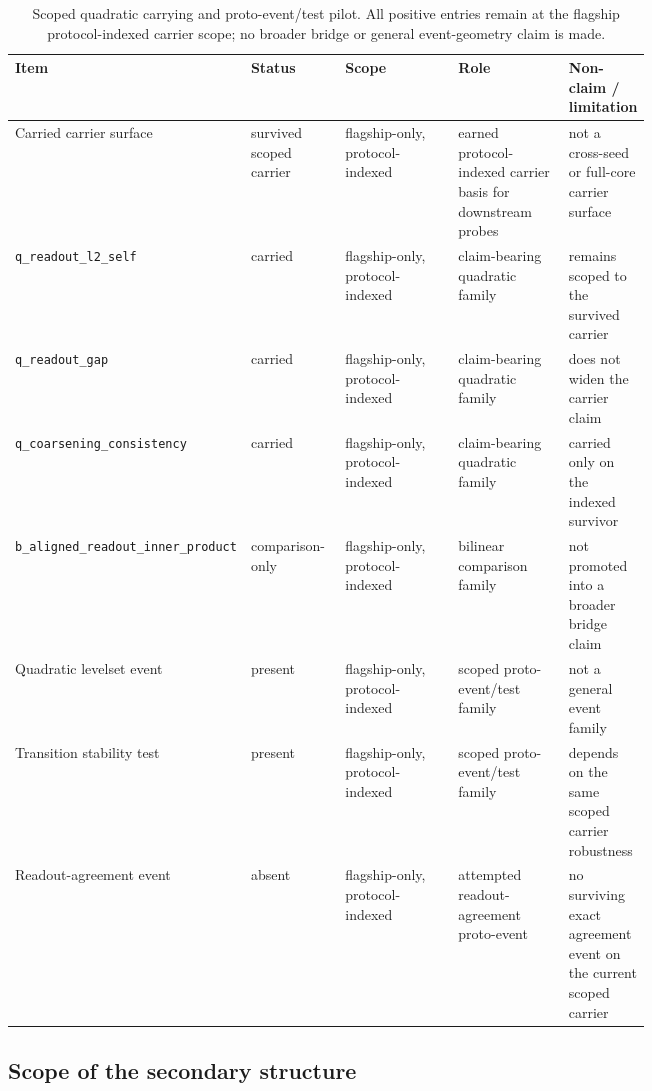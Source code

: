 \documentclass[11pt]{article}
\theoremstyle{definition}
\begin{document}
\begin{table}[t]
\centering
\footnotesize
\caption{Scoped quadratic carrying and proto-event/test pilot. All positive entries remain
at the flagship protocol-indexed carrier scope; no broader bridge or general
event-geometry claim is made.}
\label{tab:scoped-quadratic-protoevent}
\begin{tabularx}{\linewidth}{@{}>{\raggedright\arraybackslash}p{0.22\linewidth}>{\raggedright\arraybackslash}p{0.15\linewidth}>{\raggedright\arraybackslash}p{0.19\linewidth}>{\raggedright\arraybackslash}p{0.18\linewidth}>{\raggedright\arraybackslash}X@{}}
\toprule
Item & Status & Scope & Role & Non-claim / limitation \\
\midrule
Carried carrier surface & survived scoped carrier & flagship-only, protocol-indexed & earned protocol-indexed carrier basis for downstream probes & not a cross-seed or full-core carrier surface \\
\nolinkurl{q_readout_l2_self} & carried & flagship-only, protocol-indexed & claim-bearing quadratic family & remains scoped to the survived carrier \\
\nolinkurl{q_readout_gap} & carried & flagship-only, protocol-indexed & claim-bearing quadratic family & does not widen the carrier claim \\
\nolinkurl{q_coarsening_consistency} & carried & flagship-only, protocol-indexed & claim-bearing quadratic family & carried only on the indexed survivor \\
\nolinkurl{b_aligned_readout_inner_product} & comparison-only & flagship-only, protocol-indexed & bilinear comparison family & not promoted into a broader bridge claim \\
Quadratic levelset event & present & flagship-only, protocol-indexed & scoped proto-event/test family & not a general event family \\
Transition stability test & present & flagship-only, protocol-indexed & scoped proto-event/test family & depends on the same scoped carrier robustness \\
Readout-agreement event & absent & flagship-only, protocol-indexed & attempted readout-agreement proto-event & no surviving exact agreement event on the current scoped carrier \\
\bottomrule
\end{tabularx}
\end{table}

\subsection{Scope of the secondary structure}
\end{document}

